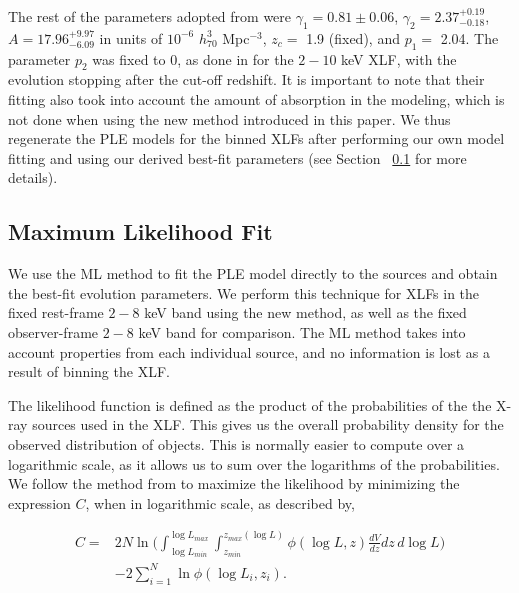\documentclass[fleqn,usenatbib]{mnras}
\begin{document}
	The rest of the parameters adopted from \cite{ebrero2009xmm} were $\gamma_1 = 0.81\pm0.06$, $\gamma_2 = 2.37^{+0.19}_{-0.18}$, $A = 17.96^{+9.97}_{-6.09}$ in units of $10^{-6}$ $h^{3}_{70}$ Mpc$^{-3}$, $z_c =$ 1.9 (fixed), and $p_1 =$ 2.04.
	The parameter $p_{2}$ was fixed to 0, as done in \cite{ebrero2009xmm} for the $2-10$ keV XLF, with the evolution stopping after the cut-off redshift.
	It is important to note that their fitting also took into account the amount of absorption in the modeling, which is not done when using the new method introduced in this paper.
	We thus regenerate the PLE models for the binned XLFs after performing our own model fitting and using our derived best-fit parameters (see Section~ \ref{subsec:mlfit} for more details).


	\subsection{Maximum Likelihood Fit}\label{subsec:mlfit}  
	
	We use the ML method \citep{crawford1970mlmethod} to fit the PLE model directly to the sources and obtain the best-fit evolution parameters.
	We perform this technique for XLFs in the fixed rest-frame $2-8$ keV band using the new method, as well as the fixed observer-frame $2-8$ keV band for comparison. 
	The ML method takes into account properties from each individual source, and no information is lost as a result of binning the XLF.
		
	The likelihood function is defined as the product of the probabilities of the the X-ray sources used in the XLF.
	This gives us the overall probability density for the observed distribution of objects.
	This is normally easier to compute over a logarithmic scale, as it allows us to sum over the logarithms of the probabilities.
	We follow the method from \cite{page2021uvlf} to maximize the likelihood by minimizing the expression $C$, when in logarithmic scale, as described by,

		\begin{align}\label{eq:mlminfunc3}
		C = & 2N \ln \bigg(\int_{\log L_{min}}^{\log L_{max}} \int_{z_{min}}^{z_{max}(\log L)} \phi(\log L,z) \frac{dV}{dz} dz \, d \log L \bigg)  \\
		&- 2 \sum_{i=1}^{N}\ln \phi(\log L_{i},z_{i}). \nonumber
		\end{align}
		
\end{document}
